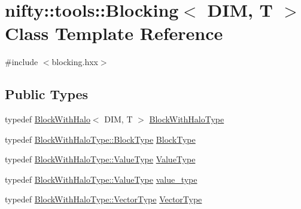 \hypertarget{classnifty_1_1tools_1_1Blocking}{}\section{nifty\+:\+:tools\+:\+:Blocking$<$ D\+I\+M, T $>$ Class Template Reference}
\label{classnifty_1_1tools_1_1Blocking}


{\ttfamily \#include $<$blocking.\+hxx$>$}

\subsection*{Public Types}
\begin{DoxyCompactItemize}
\item 
typedef \hyperlink{classnifty_1_1tools_1_1BlockWithHalo}{Block\+With\+Halo}$<$ D\+I\+M, T $>$ \hyperlink{classnifty_1_1tools_1_1Blocking_abebd9361d89cc399bc495861fa4e331d}{Block\+With\+Halo\+Type}
\item 
typedef \hyperlink{classnifty_1_1tools_1_1BlockWithHalo_a98d2c04518f8902ab6d985feba605987}{Block\+With\+Halo\+Type\+::\+Block\+Type} \hyperlink{classnifty_1_1tools_1_1Blocking_a597e0d4186d2d40ccb96698cc16775c6}{Block\+Type}
\item 
typedef \hyperlink{classnifty_1_1tools_1_1BlockWithHalo_a65d120db84dfca7586ae5ab30f26f01b}{Block\+With\+Halo\+Type\+::\+Value\+Type} \hyperlink{classnifty_1_1tools_1_1Blocking_ae04f69cd6e67bbde26eee3f38e0257f7}{Value\+Type}
\item 
typedef \hyperlink{classnifty_1_1tools_1_1BlockWithHalo_a65d120db84dfca7586ae5ab30f26f01b}{Block\+With\+Halo\+Type\+::\+Value\+Type} \hyperlink{classnifty_1_1tools_1_1Blocking_a4ea21e967d25e621a000176dc994c85e}{value\+\_\+type}
\item 
typedef \hyperlink{classnifty_1_1tools_1_1BlockWithHalo_a040d8a654eb42791c6e5fbd4dfd51b9f}{Block\+With\+Halo\+Type\+::\+Vector\+Type} \hyperlink{classnifty_1_1tools_1_1Blocking_a5f8df3d4cdf09803217d729a04018fb3}{Vector\+Type}
\end{DoxyCompactItemize}

